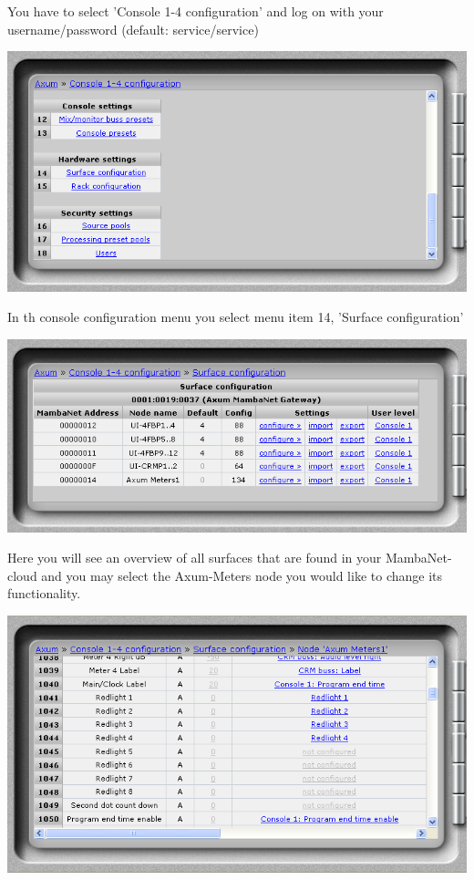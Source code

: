 \vspace{5mm}

You have to select 'Console 1-4 configuration' and log on with your username/password (default: service/service)

\vspace{5mm}

\includegraphics[width=13.5cm]{consoleconfig.png}

\vspace{5mm}

In th console configuration menu you select menu item 14, 'Surface configuration' 

\vspace{5mm}

\includegraphics[width=13.5cm]{surfaceconfig.png}

\vspace{5mm}

Here you will see an overview of all surfaces that are found in your MambaNet-cloud and you may select the Axum-Meters node you would like to change its functionality.

\vspace{5mm}

\includegraphics[width=13.5cm]{nodeconfig.png}

